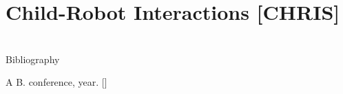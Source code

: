 \documentclass[compress]{beamer}
\begin{document}
\section{Child-Robot Interactions [CHRIS]}


\subsection{}



\section{}



%
%
%
%



\closingtitle


\begin{frame}{Bibliography}
    \begin{thebibliography}{10}

\beamertemplatearticlebibitems
       A B.
      \newblock {}
      \newblock conference, year. [\href{https:// github.com/}{\faGithub}]

    \end{thebibliography}
\end{frame}


\end{document}
